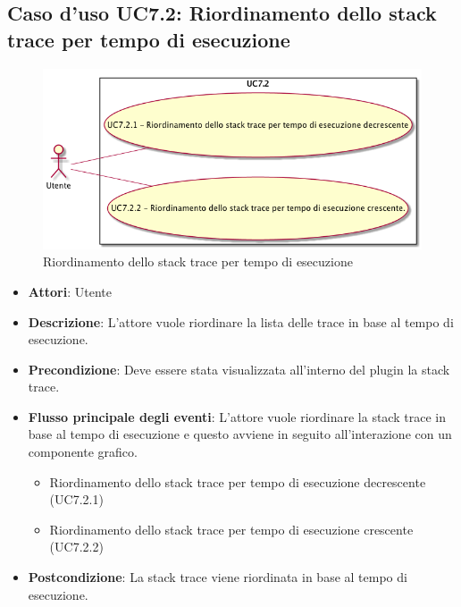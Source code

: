 \subsection{Caso d'uso UC7.2: Riordinamento dello stack trace per tempo di esecuzione}
\begin{figure} [H]
\centering
\includegraphics[scale=0.45]{./UC/UC7-2.png}
\caption{Riordinamento dello stack trace per tempo di esecuzione}\label{}
\end{figure}
\begin{itemize}
\item \textbf{Attori}: Utente
\item \textbf{Descrizione}: L'attore vuole riordinare la lista delle trace in base al tempo di esecuzione.
\item \textbf{Precondizione}: Deve essere stata visualizzata all'interno del plugin la stack trace.
\item \textbf{Flusso principale degli eventi}: L'attore vuole riordinare la stack trace in base al tempo di esecuzione e questo avviene in seguito all'interazione con un componente grafico.
\begin{itemize}
\item Riordinamento dello stack trace per tempo di esecuzione decrescente (UC7.2.1)
\item Riordinamento dello stack trace per tempo di esecuzione crescente (UC7.2.2)
\end{itemize}
\item \textbf{Postcondizione}: La stack trace viene riordinata in base al tempo di esecuzione.
\end{itemize}
